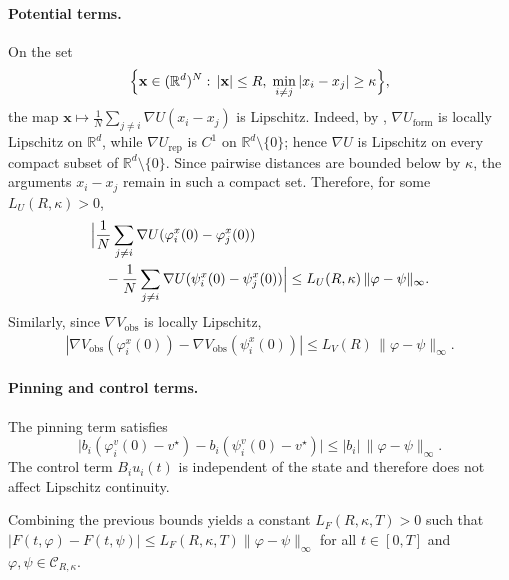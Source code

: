 \documentclass[pdflatex,sn-mathphys-num]{sn-jnl}%
\numberwithin{equation}{section}
\theoremstyle{thmstyleone}%
\theoremstyle{remark}
\theoremstyle{definition}
\newcommand{\R}{\mathbb{R}}
\newcommand{\vstar}{v^{\star}}
\begin{document}
\paragraph{Potential terms.}
On the set
\begin{equation*}
  \Bigl\{ \mathbf{x}\in(\R^d)^N:\, |\mathbf{x}|\le R,\;
    \min_{i\neq j}|x_i-x_j|\ge\kappa \Bigr\},
\end{equation*}
the map
$\mathbf{x}\mapsto \frac1N\sum_{j\neq i}\nabla U(x_i-x_j)$
is Lipschitz. Indeed, by , $\nabla U_{\mathrm{form}}$ is
locally Lipschitz on $\R^d$, while $\nabla U_{\mathrm{rep}}$ is $C^1$ on
$\R^d\setminus\{0\}$; hence $\nabla U$ is Lipschitz on every compact subset
of $\R^d\setminus\{0\}$. Since pairwise distances are bounded below by
$\kappa$, the arguments $x_i-x_j$ remain in such a compact set. Therefore,
for some $L_U(R,\kappa)>0$,
\begin{equation*}
\begin{aligned}
  &\Bigl| \frac1N\sum_{j\neq i}\nabla U(\varphi_i^x(0)-\varphi_j^x(0)) \\
  &\quad - \frac1N\sum_{j\neq i}\nabla U(\psi_i^x(0)-\psi_j^x(0)) \Bigr|
  \le L_U(R,\kappa)\,\|\varphi-\psi\|_\infty.
\end{aligned}
\end{equation*}
Similarly, since $\nabla V_{\mathrm{obs}}$ is locally Lipschitz,
\begin{equation*}
\begin{aligned}
  |\nabla V_{\mathrm{obs}}(\varphi_i^x(0))
   -\nabla V_{\mathrm{obs}}(\psi_i^x(0))|
  \le L_V(R)\,\|\varphi-\psi\|_\infty.
\end{aligned}
\end{equation*}
\paragraph{Pinning and control terms.}
The pinning term satisfies
\begin{equation*}
  \bigl| b_i(\varphi_i^v(0)-\vstar)-b_i(\psi_i^v(0)-\vstar) \bigr|
  \le |b_i|\,\|\varphi-\psi\|_\infty.
\end{equation*}
The control term $B_i u_i(t)$ is independent of the state and therefore
does not affect Lipschitz continuity.

Combining the previous bounds yields a constant $L_F(R,\kappa,T)>0$ such
that
$|F(t,\varphi)-F(t,\psi)| \le L_F(R,\kappa,T)\|\varphi-\psi\|_\infty$
for all $t\in[0,T]$ and $\varphi,\psi\in\mathcal C_{R,\kappa}$.
\end{document}
